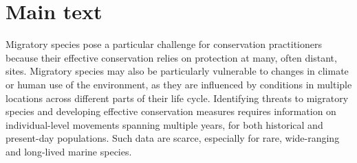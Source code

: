\documentclass[a4paper,12pt]{article}
\begin{document}
\newpage
\section{Main text}
Migratory species pose a particular challenge for conservation practitioners because their effective conservation relies on protection at many, often distant, sites\cite{runge2014conserving}.
Migratory species may also be particularly vulnerable to changes in climate or human use of the environment, as they are influenced by conditions in multiple locations across different parts of their life cycle\cite{robinson2009travelling}. 
Identifying threats to migratory species and developing effective conservation measures requires information on individual-level movements spanning multiple years, for both historical and present-day populations. 
Such data are scarce, especially for rare, wide-ranging and long-lived marine species\cite{ryan2013stable,hall2005stable,bailey2009behavioural}. 
 
\end{document}
